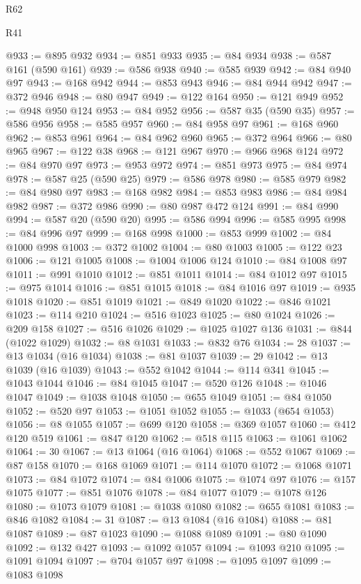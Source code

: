 \begin{lexlean}{R62}
\begin{lexlean}{R41}
\begin{coremodule}
{{{{{{{{{{{{{{{{{{{{{{{{{{{{{{{{{{{{{{{{{{{{{{{{{{{{{{{{{{{{{{{{{{{{{{{{{{{{{{{{{{{{{{{@933 := @895 @932
@934 := @851 @933
@935 := @84 @934
@938 := @587 @161 (@590 @161)
@939 := @586 @938
@940 := @585 @939
@942 := @84 @940 @97
@943 := @168 @942
@944 := @853 @943
@946 := @84 @944 @942
@947 := @372 @946
@948 := @80 @947
@949 := @122 @164
@950 := @121 @949
@952 := @948 @950 @124
@953 := @84 @952
@956 := @587 @35 (@590 @35)
@957 := @586 @956
@958 := @585 @957
@960 := @84 @958 @97
@961 := @168 @960
@962 := @853 @961
@964 := @84 @962 @960
@965 := @372 @964
@966 := @80 @965
@967 := @122 @38
@968 := @121 @967
@970 := @966 @968 @124
@972 := @84 @970 @97
@973 := @953 @972
@974 := @851 @973
@975 := @84 @974
@978 := @587 @25 (@590 @25)
@979 := @586 @978
@980 := @585 @979
@982 := @84 @980 @97
@983 := @168 @982
@984 := @853 @983
@986 := @84 @984 @982
@987 := @372 @986
@990 := @80 @987 @472 @124
@991 := @84 @990
@994 := @587 @20 (@590 @20)
@995 := @586 @994
@996 := @585 @995
@998 := @84 @996 @97
@999 := @168 @998
@1000 := @853 @999
@1002 := @84 @1000 @998
@1003 := @372 @1002
@1004 := @80 @1003
@1005 := @122 @23
@1006 := @121 @1005
@1008 := @1004 @1006 @124
@1010 := @84 @1008 @97
@1011 := @991 @1010
@1012 := @851 @1011
@1014 := @84 @1012 @97
@1015 := @975 @1014
@1016 := @851 @1015
@1018 := @84 @1016 @97
@1019 := @935 @1018
@1020 := @851 @1019
@1021 := @849 @1020
@1022 := @846 @1021
@1023 := @114 @210
@1024 := @516 @1023
@1025 := @80 @1024
@1026 := @209 @158
@1027 := @516 @1026
@1029 := @1025 @1027 @136
@1031 := @844 (@1022 @1029)
@1032 := @8 @1031
@1033 := @832 @76
@1034 := 28
@1037 := @13 @1034 (@16 @1034)
@1038 := @81 @1037
@1039 := 29
@1042 := @13 @1039 (@16 @1039)
@1043 := @552 @1042
@1044 := @114 @341
@1045 := @1043 @1044
@1046 := @84 @1045
@1047 := @520 @126
@1048 := @1046 @1047
@1049 := @1038 @1048
@1050 := @655 @1049
@1051 := @84 @1050
@1052 := @520 @97
@1053 := @1051 @1052
@1055 := @1033 (@654 @1053)
@1056 := @8 @1055
@1057 := @699 @120
@1058 := @369 @1057
@1060 := @412 @120 @519
@1061 := @847 @120
@1062 := @518 @115
@1063 := @1061 @1062
@1064 := 30
@1067 := @13 @1064 (@16 @1064)
@1068 := @552 @1067
@1069 := @87 @158
@1070 := @168 @1069
@1071 := @114 @1070
@1072 := @1068 @1071
@1073 := @84 @1072
@1074 := @84 @1006
@1075 := @1074 @97
@1076 := @157 @1075
@1077 := @851 @1076
@1078 := @84 @1077
@1079 := @1078 @126
@1080 := @1073 @1079
@1081 := @1038 @1080
@1082 := @655 @1081
@1083 := @846 @1082
@1084 := 31
@1087 := @13 @1084 (@16 @1084)
@1088 := @81 @1087
@1089 := @87 @1023
@1090 := @1088 @1089
@1091 := @80 @1090
@1092 := @132 @427
@1093 := @1092 @1057
@1094 := @1093 @210
@1095 := @1091 @1094
@1097 := @704 @1057 @97
@1098 := @1095 @1097
@1099 := @1083 @1098
}}}}}}}}}}}}}}}}}}}}}}}}}}}}}}}}}}}}}}}}}}}}}}}}}}}}}}}}}}}}}}}}}}}}}}}}}}}}}}}}}}}}}}}
\end{coremodule}
\end{lexlean}
\end{lexlean}
